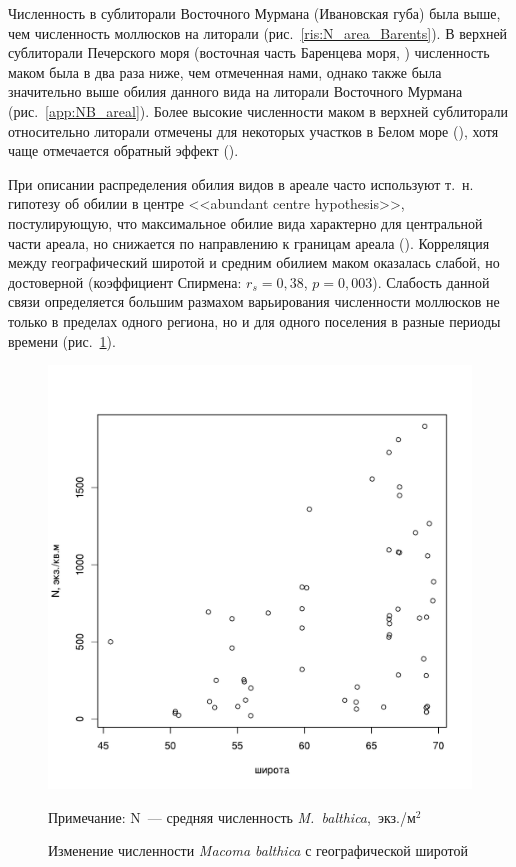 Численность в сублиторали Восточного Мурмана (Ивановская губа) была выше, чем численность моллюсков на литорали (рис.~\ref{ris:N_area_Barents}).
В верхней сублиторали Печерского моря (восточная часть Баренцева моря, \cite{Denisenko_et_al_2003}) численность маком была в два раза ниже, чем отмеченная нами, однако также была значительно выше обилия данного вида на литорали Восточного Мурмана (рис.~\ref{app:NB_areal}).
Более высокие численности маком в верхней сублиторали относительно литорали отмечены для некоторых участков в Белом море (\cite{Semenova_1974}), хотя чаще отмечается обратный эффект (\cite{Semenova_1974, Maximovich_et_al_1991}).

При описании распределения обилия видов в ареале часто используют т.~н. гипотезу об обилии в центре <<abundant centre hypothesis>>, постулирующую, что максимальное обилие вида характерно для центральной части ареала, но снижается по направлению к границам ареала (\cite{Sagarin_et_al_2006}).
Корреляция между географический широтой и средним обилием маком оказалась слабой, но достоверной (коэффициент Спирмена: $r_{s} = 0,38$, $p = 0,003$).
Слабость данной связи определяется большим размахом варьирования численности моллюсков не только в пределах одного региона, но и для одного поселения в разные периоды времени (рис.~\ref{ris:lat_vs_Nmean}). 
	\begin{figure}[p]
    \includegraphics[width=\textwidth]{../macrodistribution/lat_vs_Nmean1.pdf}
    \caption{Изменение численности {\it Macoma balthica} с географической широтой}

{\footnotesize Примечание: N~--- средняя численность {\it M.~balthica},~экз./м$^2$}
    \label{ris:lat_vs_Nmean}
	\end{figure}
